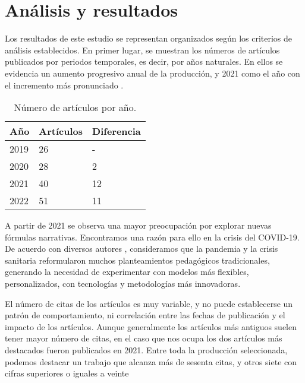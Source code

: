 \section{Análisis y resultados}\label{sec-análisisyresultados}

Los resultados de este estudio se representan organizados según los
criterios de análisis establecidos. En primer lugar, se muestran los
números de artículos publicados por periodos temporales, es decir, por
años naturales. En ellos se evidencia un aumento progresivo anual de la
producción, y 2021 como el año con el incremento más pronunciado .

\begin{table}[htbp]
\centering
\begin{threeparttable}
\caption{Número de artículos por año.}
\label{tab-01}
\begin{tabular}{lll}
\toprule
Año & Artículos & Diferencia\\
\midrule
2019 & 26 & - \\
2020 & 28 & 2 \\
2021 & 40 & 12\\
2022 & 51 & 11\\
\bottomrule
\end{tabular}
\end{threeparttable}
\end{table}

A partir de 2021 se observa una mayor preocupación por explorar nuevas
fórmulas narrativas. Encontramos una razón para ello en la crisis del
COVID-19. De acuerdo con diversos autores \cite{monroy_retos_2021,torras_virgili_emergency_2021,una_martin_aproximacion_2020,vilhelm_rios_didactica_2022}, consideramos que la
pandemia y la crisis sanitaria reformularon muchos planteamientos
pedagógicos tradicionales, generando la necesidad de experimentar con
modelos más flexibles, personalizados, con tecnologías y metodologías
más innovadoras.

El número de citas de los artículos es muy variable, y no puede
establecerse un patrón de comportamiento, ni correlación entre las
fechas de publicación y el impacto de los artículos. Aunque generalmente
los artículos más antiguos suelen tener mayor número de citas, en el
caso que nos ocupa los dos artículos más destacados fueron publicados en
2021. Entre toda la producción seleccionada, podemos destacar un trabajo
que alcanza más de sesenta citas, y otros siete con cifras superiores o
iguales a veinte 

